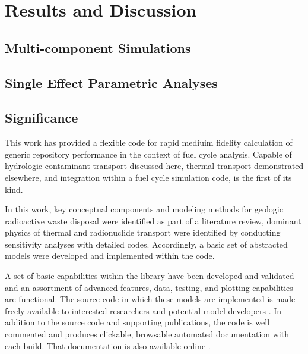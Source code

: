 \section{Results and Discussion}

\subsection{Multi-component Simulations}




\subsection{Single Effect Parametric Analyses}



\FloatBarrier
\subsection{Significance}

This work has provided a flexible code for rapid mediuim fidelity calculation
of generic repository performance in the context of fuel cycle analysis.
Capable of hydrologic contaminant transport discussed here, thermal transport
demonstrated elsewhere, and integration within a fuel cycle simulation code,
\Cyder is the first of its kind.

In this work, key conceptual components and modeling methods for geologic
radioactive waste disposal were identified as part of a literature review,
dominant physics of thermal and radionuclide transport were identified by
conducting sensitivity analyses with detailed codes. Accordingly, a basic set
of abstracted models were developed and implemented within the \Cyder code.

A set of basic capabilities within the \Cyder library have been developed and
validated and an assortment of advanced features, data, testing, and plotting
capabilities are functional. The \Cyder source code in which these models are
implemented is made freely available to interested researchers and potential
model developers \cite{huff_cyder_2013}. In addition to the source code and
supporting publications, the \Cyder code is well commented and produces
clickable, browsable automated documentation with each build. That
documentation is also available online \cite{huff_cyder_2013}.

